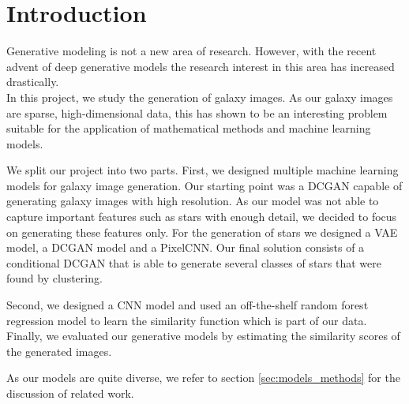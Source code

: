 \documentclass[10pt,conference,compsocconf]{IEEEtran}
\begin{document}
\section{Introduction}
\label{sec:introduction}
Generative modeling is not a new area of research. However, with the recent advent of deep generative models the research interest in this area has increased drastically. \\ 
In this project, we study the generation of galaxy images. As our galaxy images are sparse, high-dimensional data, this has shown to be an interesting problem suitable for the application of mathematical methods and machine learning models.

We split our project into two parts. First, we designed multiple machine learning models for galaxy image generation. Our starting point was a DCGAN capable of generating galaxy images with high resolution. As our model was not able to capture important features such as stars with enough detail, we decided to focus on generating these features only. For the generation of stars we designed a VAE model, a DCGAN model and a PixelCNN. Our final solution consists of a conditional DCGAN that is able to generate several classes of stars that were found by clustering.

Second, we designed a CNN model and used an off-the-shelf random forest regression model to learn the similarity function which is part of our data. Finally, we evaluated our generative models by estimating the similarity scores of the generated images. 

As our models are quite diverse, we refer to section \ref{sec:models_methods} for the discussion of related work.



\end{document}
